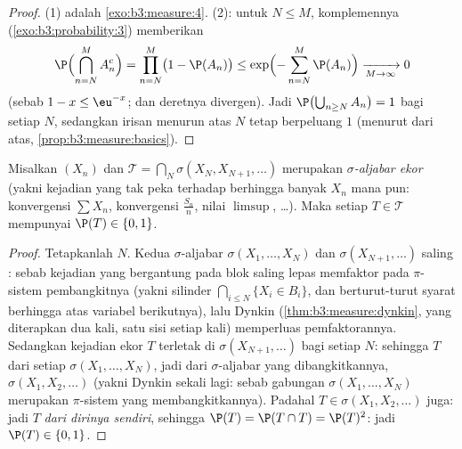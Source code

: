 \begin{proof}
(1) adalah \cref{exo:b3:measure:4}. (2): untuk $N \leq M$,
 komplemennya (\cref{exo:b3:probability:3})
memberikan
\[
\P\Bigl(\bigcap_{n=N}^{M}A_n^c\Bigr) = \prod_{n=N}^M\bigl(1
- \P(A_n)\bigr) \leq
\exp\Bigl(-\sum_{n=N}^M\P(A_n)\Bigr) \xrightarrow[M \to
\infty]{} 0
\]
(sebab $1 - x \leq \eu^{-x}$; dan deretnya divergen). Jadi
$\P\bigl(\bigcup_{n\geq N}A_n\bigr) = 1$ bagi setiap $N$, sedangkan
irisan menurun atas $N$ tetap berpeluang
$1$ (menurut  dari atas, \cref{prop:b3:measure:basics}).
\end{proof}

\begin{theorem}
\label{thm:b3:probability:zeroone}
Misalkan $(X_n)$  dan $\mathcal T =
\bigcap_N\sigma(X_N, X_{N+1}, \dots)$ merupakan \emph{$\sigma$-aljabar
ekor} (yakni kejadian yang
tak peka terhadap berhingga banyak $X_n$ mana pun: konvergensi
$\sum X_n$, konvergensi $\frac{S_n}n$, nilai $\limsup$, \dots).
Maka setiap $T \in \mathcal T$ mempunyai $\P(T) \in \{0,
1\}$.
\end{theorem}

\begin{proof}
Tetapkanlah $N$. Kedua $\sigma$-aljabar $\sigma(X_1, \dots, X_N)$ dan
$\sigma(X_{N+1}, \dots)$ saling : sebab kejadian yang bergantung pada
blok saling lepas memfaktor pada $\pi$-sistem pembangkitnya
(yakni silinder $\bigcap_{i\leq N}\{X_i \in B_i\}$, dan berturut-turut syarat
berhingga atas variabel berikutnya), lalu Dynkin
(\cref{thm:b3:measure:dynkin}, yang diterapkan dua kali, satu sisi setiap
kali) memperluas pemfaktorannya. Sedangkan kejadian ekor $T$ terletak di
$\sigma(X_{N+1}, \dots)$ bagi setiap $N$: sehingga $T$  dari
setiap $\sigma(X_1, \dots, X_N)$, jadi  dari $\sigma$-aljabar
yang dibangkitkannya, $\sigma(X_1, X_2, \dots)$ (yakni Dynkin sekali lagi:
sebab gabungan $\sigma(X_1,\dots,X_N)$ merupakan $\pi$-sistem
yang membangkitkannya). Padahal $T \in \sigma(X_1, X_2, \dots)$ juga: jadi $T$
 \emph{dari dirinya sendiri}, sehingga $\P(T) = \P(T\cap T) =
\P(T)^2$: jadi $\P(T) \in \{0, 1\}$.
\end{proof}

